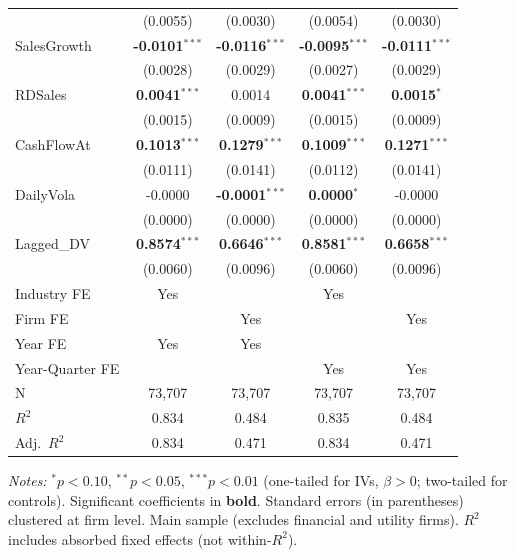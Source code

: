 \documentclass[11pt,a4paper]{article}
\begin{document}
\begin{table}[htbp]
\begin{tabular}{lcccc}
 & (0.0055) & (0.0030) & (0.0054) & (0.0030) \\
SalesGrowth & \textbf{-0.0101}$^{***}$ & \textbf{-0.0116}$^{***}$ & \textbf{-0.0095}$^{***}$ & \textbf{-0.0111}$^{***}$ \\
 & (0.0028) & (0.0029) & (0.0027) & (0.0029) \\
RDSales & \textbf{0.0041}$^{***}$ & 0.0014 & \textbf{0.0041}$^{***}$ & \textbf{0.0015}$^{*}$ \\
 & (0.0015) & (0.0009) & (0.0015) & (0.0009) \\
CashFlowAt & \textbf{0.1013}$^{***}$ & \textbf{0.1279}$^{***}$ & \textbf{0.1009}$^{***}$ & \textbf{0.1271}$^{***}$ \\
 & (0.0111) & (0.0141) & (0.0112) & (0.0141) \\
DailyVola & -0.0000 & \textbf{-0.0001}$^{***}$ & \textbf{0.0000}$^{*}$ & -0.0000 \\
 & (0.0000) & (0.0000) & (0.0000) & (0.0000) \\
Lagged\_DV & \textbf{0.8574}$^{***}$ & \textbf{0.6646}$^{***}$ & \textbf{0.8581}$^{***}$ & \textbf{0.6658}$^{***}$ \\
 & (0.0060) & (0.0096) & (0.0060) & (0.0096) \\
\midrule
Industry FE & Yes &  & Yes &  \\
Firm FE &  & Yes &  & Yes \\
Year FE & Yes & Yes &  &  \\
Year-Quarter FE &  &  & Yes & Yes \\
\midrule
N & 73,707 & 73,707 & 73,707 & 73,707 \\
$R^2$ & 0.834 & 0.484 & 0.835 & 0.484 \\
Adj.~$R^2$ & 0.834 & 0.471 & 0.834 & 0.471 \\
\bottomrule
\end{tabular}
\begin{minipage}{\linewidth}
\vspace{2pt}\scriptsize
\textit{Notes:} $^{*}p<0.10$, $^{**}p<0.05$, $^{***}p<0.01$ (one-tailed for IVs, $\beta > 0$; two-tailed for controls).
 Significant coefficients in \textbf{bold}.
 Standard errors (in parentheses) clustered at firm level.
 Main sample (excludes financial and utility firms).
 $R^2$ includes absorbed fixed effects (not within-$R^2$).
\end{minipage}
\end{table}
\clearpage
\end{document}

